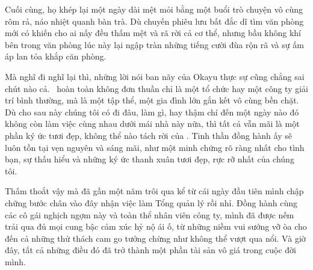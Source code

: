 \documentclass[../main.tex]{subfiles}
\begin{document}
Cuối cùng, họ khép lại một ngày dài mệt mỏi bằng một buổi trò chuyện vô cùng rôm rả, náo nhiệt quanh bàn trà. Dù chuyến phiêu lưu bất đắc dĩ tìm văn phòng mới có khiến cho ai nấy đều thấm mệt và rã rời cả cơ thể, nhưng bầu không khí bên trong văn phòng lúc này lại ngập tràn những tiếng cười đùa rộn rã và sự ấm áp lan tỏa khắp căn phòng.


Mà nghĩ đi nghĩ lại thì, những lời nói ban nãy của Okayu thực sự cũng chẳng sai chút nào cả. \hll\ hoàn toàn không đơn thuần chỉ là một tổ chức hay một công ty giải trí bình thường, mà là một tập thể, một gia đình lớn gắn kết vô cùng bền chặt. Dù cho sau này chúng tôi có đi đâu, làm gì, hay thậm chí đến một ngày nào đó không còn làm việc cùng nhau dưới mái nhà này nữa, thì tất cả vẫn mãi là một phần ký ức tươi đẹp, không thể nào tách rời của \hll. Tinh thần đồng hành ấy sẽ luôn tồn tại vẹn nguyên và sáng mãi, như một minh chứng rõ ràng nhất cho tình bạn, sự thấu hiểu và những ký ức thanh xuân tươi đẹp, rực rỡ nhất của chúng tôi.

Thấm thoắt vậy mà đã gần một năm trôi qua kể từ cái ngày đầu tiên mình chập chững bước chân vào đây nhận việc làm Tổng quản lý rồi nhỉ. Đồng hành cùng các cô gái nghịch ngợm này và toàn thể nhân viên công ty, mình đã được nếm trải qua đủ mọi cung bậc cảm xúc hỷ nộ ái ố, từ những niềm vui sướng vỡ òa cho đến cả những thử thách cam go tưởng chừng như không thể vượt qua nổi. Và giờ đây, tất cả những điều đó đã trở thành một phần tài sản vô giá trong cuộc đời mình.
\end{document}
